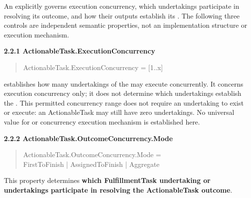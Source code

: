 An \texttt{} explicitly governs execution concurrency, which
undertakings participate in resolving its outcome, and how their outputs
establish its \texttt{}. The following three controls are independent
semantic properties, not an implementation structure or execution mechanism.



\par\medskip\textbf{2.2.1 ActionableTask.ExecutionConcurrency}\par


\begin{quote}\small\ttfamily
ActionableTask.ExecutionConcurrency = [1..x]\\

\end{quote}


\texttt{} establishes how many \texttt{} undertakings of
the \texttt{} may execute concurrently. It concerns execution
concurrency only; it does not determine which undertakings establish the
\texttt{}. This permitted concurrency range does not require an
undertaking to exist or execute: an ActionableTask may still have zero
undertakings. No universal value for \texttt{} or concurrency execution mechanism
is established here.



\par\medskip\textbf{2.2.2 ActionableTask.OutcomeConcurrency.Mode}\par


\begin{quote}\small\ttfamily
ActionableTask.OutcomeConcurrency.Mode =\\
    FirstToFinish | AssignedToFinish | Aggregate\\

\end{quote}


This property determines \textbf{which FulfillmentTask undertaking or undertakings
participate in resolving the ActionableTask outcome}.



